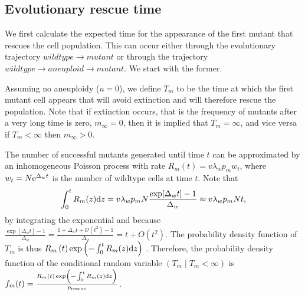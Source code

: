 \documentclass[12pt]{extarticle}
\renewcommand{\d}[1]{\ensuremath{\operatorname{d}\!{#1}}}
\renewcommand{\d}{{\rm d}}
\newcommand{\e}{{\rm e}}
\newcommand{\presc}{p_\text{rescue}}
\begin{document}
\begin{appendices}
\section{Evolutionary rescue time}

We first calculate the expected time for the appearance of the first mutant that rescues the cell population.
This can occur either through the evolutionary trajectory $wildtype \rightarrow mutant$ or through the trajectory $wildtype \rightarrow aneuploid \rightarrow mutant$.
We start with the former. 

Assuming no aneuploidy ($u=0$), we define $T_m$ to be the time at which the first mutant cell appears that will avoid extinction and will therefore rescue the population.
Note that if extinction occurs, that is the frequency of mutants after a very long time is zero, $m_{\infty}=0$, then it is implied that $T_m=\infty$, and vice versa if $T_m<\infty$ then $m_{\infty}>0$.

The number of successful mutants generated until time $t$ can be approximated by an inhomogeneous Poisson process with rate $R_m\left(t\right) = v\lambda_w p_m w_t$,
where $w_t=N\e^{\Delta_w t}$ is the number of wildtype cells at time $t$.
Note that 
\begin{equation}\label{eq:integralR}
\int_0^{t}{R_m(z)\d z} = 
v\lambda_w p_m N \frac{\exp[{\Delta_w t}]-1}{\Delta_w} \approx 
v\lambda_w p_m N t,
\end{equation}
by integrating the exponential and because $\frac{\exp[\Delta_w t]-1}{\Delta_w}=\frac{1+\Delta_w t+\mathcal{O}(t^2)-1}{\Delta_w}=t+O(t^2)$.
The probability density function of $T_m$ is thus
$R_m\left(t\right)\exp\left(-\int_0^{t}{R_m(z)\d z}\right)$ \citep{allen2010introduction}. 
Therefore, the probability density function of the conditional random variable $(T_m \mid T_m < \infty)$ is
$f_m(t) = \frac{R_m\left(t\right)\exp\left(-\int_0^{t}{R_m(z)\d z}\right)}{\presc}$. 
\\


\end{appendices}
\end{document}

